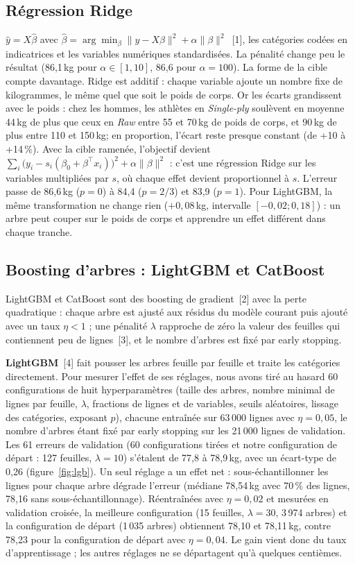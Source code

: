\documentclass[11pt,a4paper]{article}
\newcommand{\kg}{\,kg}
\newcounter{fig}
\begin{document}
\subsection{Régression Ridge}
$\hat y = X\hat\beta$ avec $\hat\beta = \arg\min_\beta \|y - X\beta\|^2 + \alpha\|\beta\|^2$~[1], les catégories
codées en indicatrices et les variables numériques standardisées. La pénalité change peu le résultat
(86,1\kg{} pour $\alpha \in [1, 10]$, 86,6 pour $\alpha = 100$). La forme de la cible compte davantage. Ridge
est additif : chaque variable ajoute un nombre fixe de kilogrammes, le même quel que soit le poids de corps.
Or les écarts grandissent avec le poids : chez les hommes, les athlètes en \emph{Single-ply} soulèvent en
moyenne 44\kg{} de plus que ceux en \emph{Raw} entre 55 et 70\kg{} de poids de corps, et 90\kg{} de plus
entre 110 et 150\kg ; en proportion, l'écart reste presque constant (de +10 à +14\,\%). Avec la cible ramenée,
l'objectif devient $\sum_i \big(y_i - s_i(\beta_0 + \beta^\top x_i)\big)^2 + \alpha\|\beta\|^2$ : c'est une régression
Ridge sur les variables multipliées par $s$, où chaque effet devient proportionnel à $s$. L'erreur passe de
86,6\kg{} ($p = 0$) à 84,4 ($p = 2/3$) et 83,9 ($p = 1$). Pour LightGBM, la même transformation ne change rien
($+0{,}08$\kg, intervalle $[-0{,}02 ; 0{,}18]$) : un arbre peut couper sur le poids de corps et apprendre un
effet différent dans chaque tranche.

\subsection{Boosting d'arbres : LightGBM et CatBoost}
LightGBM et CatBoost sont des boosting de gradient~[2] avec la perte quadratique : chaque arbre est ajusté aux
résidus du modèle courant puis ajouté avec un taux $\eta < 1$ ; une pénalité $\lambda$ rapproche de zéro la
valeur des feuilles qui contiennent peu de lignes~[3], et le nombre d'arbres est fixé par early stopping.

\textbf{LightGBM}~[4] fait pousser les arbres feuille par feuille et traite les catégories directement. Pour
mesurer l'effet de ses réglages, nous avons tiré au hasard 60 configurations de huit hyperparamètres (taille
des arbres, nombre minimal de lignes par feuille, $\lambda$, fractions de lignes et de variables, seuils
aléatoires, lissage des catégories, exposant $p$), chacune entraînée sur 63\,000 lignes avec $\eta = 0{,}05$,
le nombre d'arbres étant fixé par early stopping sur les 21\,000 lignes de validation. Les 61 erreurs de
validation (60 configurations tirées et notre configuration de départ : 127 feuilles, $\lambda = 10$)
s'étalent de 77,8 à 78,9\kg, avec un écart-type de 0,26 (figure~\ref{fig:lgb}). Un seul réglage a un effet net : sous-échantillonner les
lignes pour chaque arbre dégrade l'erreur (médiane 78,54\kg{} avec 70\,\% des lignes, 78,16 sans
sous-échantillonnage). Réentraînées avec $\eta = 0{,}02$ et mesurées en validation croisée, la meilleure
configuration (15 feuilles, $\lambda = 30$, 3\,974 arbres) et la configuration de départ (1\,035 arbres)
obtiennent 78,10 et 78,11\kg, contre 78,23 pour la configuration de départ avec $\eta = 0{,}04$. Le gain
vient donc du taux d'apprentissage ; les autres réglages ne se départagent qu'à quelques centièmes.
\end{document}
